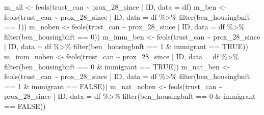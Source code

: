\documentclass[
  letterpaper,
  DIV=11,
  numbers=noendperiod]{scrartcl}
\newenvironment{Shaded}{\begin{snugshade}}{\end{snugshade}}
\newcommand{\AttributeTok}[1]{\textcolor[rgb]{0.40,0.45,0.13}{#1}}
\newcommand{\ConstantTok}[1]{\textcolor[rgb]{0.56,0.35,0.01}{#1}}
\newcommand{\DecValTok}[1]{\textcolor[rgb]{0.68,0.00,0.00}{#1}}
\newcommand{\FunctionTok}[1]{\textcolor[rgb]{0.28,0.35,0.67}{#1}}
\newcommand{\NormalTok}[1]{\textcolor[rgb]{0.00,0.23,0.31}{#1}}
\newcommand{\OtherTok}[1]{\textcolor[rgb]{0.00,0.23,0.31}{#1}}
\newcommand{\SpecialCharTok}[1]{\textcolor[rgb]{0.37,0.37,0.37}{#1}}
\begin{document}
\begin{Shaded}
\begin{Highlighting}[]
\NormalTok{m\_all }\OtherTok{\textless{}{-}} \FunctionTok{feols}\NormalTok{(trust\_can }\SpecialCharTok{\textasciitilde{}}\NormalTok{ prox\_28\_since }\SpecialCharTok{|}\NormalTok{ ID, }\AttributeTok{data =}\NormalTok{ df)}
\NormalTok{m\_ben }\OtherTok{\textless{}{-}} \FunctionTok{feols}\NormalTok{(trust\_can }\SpecialCharTok{\textasciitilde{}}\NormalTok{ prox\_28\_since }\SpecialCharTok{|}\NormalTok{ ID,}
               \AttributeTok{data =}\NormalTok{ df }\SpecialCharTok{\%\textgreater{}\%} \FunctionTok{filter}\NormalTok{(ben\_housingbnft }\SpecialCharTok{==} \DecValTok{1}\NormalTok{))}
\NormalTok{m\_noben }\OtherTok{\textless{}{-}} \FunctionTok{feols}\NormalTok{(trust\_can }\SpecialCharTok{\textasciitilde{}}\NormalTok{ prox\_28\_since }\SpecialCharTok{|}\NormalTok{ ID,}
                 \AttributeTok{data =}\NormalTok{ df }\SpecialCharTok{\%\textgreater{}\%} \FunctionTok{filter}\NormalTok{(ben\_housingbnft }\SpecialCharTok{==} \DecValTok{0}\NormalTok{))}
\NormalTok{m\_imm\_ben }\OtherTok{\textless{}{-}} \FunctionTok{feols}\NormalTok{(trust\_can }\SpecialCharTok{\textasciitilde{}}\NormalTok{ prox\_28\_since }\SpecialCharTok{|}\NormalTok{ ID,}
                   \AttributeTok{data =}\NormalTok{ df }\SpecialCharTok{\%\textgreater{}\%} \FunctionTok{filter}\NormalTok{(ben\_housingbnft }\SpecialCharTok{==} \DecValTok{1} \SpecialCharTok{\&}\NormalTok{ immigrant }\SpecialCharTok{==} \ConstantTok{TRUE}\NormalTok{))}
\NormalTok{m\_imm\_noben }\OtherTok{\textless{}{-}} \FunctionTok{feols}\NormalTok{(trust\_can }\SpecialCharTok{\textasciitilde{}}\NormalTok{ prox\_28\_since }\SpecialCharTok{|}\NormalTok{ ID,}
                     \AttributeTok{data =}\NormalTok{ df }\SpecialCharTok{\%\textgreater{}\%} \FunctionTok{filter}\NormalTok{(ben\_housingbnft }\SpecialCharTok{==} \DecValTok{0} \SpecialCharTok{\&}\NormalTok{ immigrant }\SpecialCharTok{==} \ConstantTok{TRUE}\NormalTok{))}
\NormalTok{m\_nat\_ben }\OtherTok{\textless{}{-}} \FunctionTok{feols}\NormalTok{(trust\_can }\SpecialCharTok{\textasciitilde{}}\NormalTok{ prox\_28\_since }\SpecialCharTok{|}\NormalTok{ ID,}
                   \AttributeTok{data =}\NormalTok{ df }\SpecialCharTok{\%\textgreater{}\%} \FunctionTok{filter}\NormalTok{(ben\_housingbnft }\SpecialCharTok{==} \DecValTok{1} \SpecialCharTok{\&}\NormalTok{ immigrant }\SpecialCharTok{==} \ConstantTok{FALSE}\NormalTok{))}
\NormalTok{m\_nat\_noben }\OtherTok{\textless{}{-}} \FunctionTok{feols}\NormalTok{(trust\_can }\SpecialCharTok{\textasciitilde{}}\NormalTok{ prox\_28\_since }\SpecialCharTok{|}\NormalTok{ ID,}
                     \AttributeTok{data =}\NormalTok{ df }\SpecialCharTok{\%\textgreater{}\%} \FunctionTok{filter}\NormalTok{(ben\_housingbnft }\SpecialCharTok{==} \DecValTok{0} \SpecialCharTok{\&}\NormalTok{ immigrant }\SpecialCharTok{==} \ConstantTok{FALSE}\NormalTok{))}


\end{Highlighting}
\end{Shaded}
\end{document}
